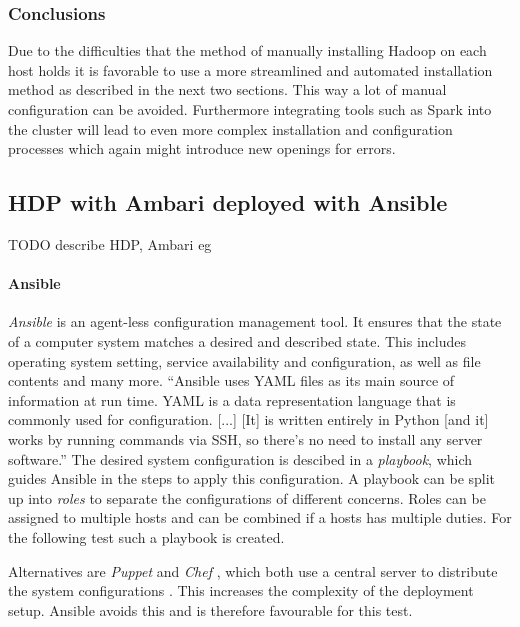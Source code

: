 \subsubsection{Conclusions}

Due to the difficulties that the method of manually installing Hadoop on each host holds it is favorable to use a more streamlined 
and automated installation method as described in the next two sections.
This way a lot of manual configuration can be avoided.
Furthermore integrating tools such as Spark into the cluster 
will lead to even more complex installation and configuration processes which again might introduce new openings for errors.

\subsection{\acl{HDP} with Ambari deployed with Ansible}
\label{sec:design:hdp_ambari_ansible}
TODO describe HDP, Ambari
eg \autocite[][]{hortonworks2018ambari}

\paragraph{Ansible}
\emph{Ansible} is an agent-less configuration management tool.
It ensures that the state of a computer system matches a desired and described state.
This includes operating system setting, service availability and configuration, 
as well as file contents and many more.
\enquote{Ansible uses \ac{YAML} files as its main source of information at run time. 
\ac{YAML} is a data representation language that is commonly used for configuration.
[...]
[It] is written entirely in Python [and it] works by running commands via \ac{SSH}, so there’s no need to install any server software.}
\autocite[][Chap. 1]{heap2016ansible}
The desired system configuration is descibed in a \emph{playbook}, 
which guides Ansible in the steps to apply this configuration.
A playbook can be split up into \emph{roles} to separate the configurations of different concerns.
Roles can be assigned to multiple hosts and can be combined if a hosts has multiple duties.
For the following test such a playbook is created.

Alternatives are \emph{Puppet}  and \emph{Chef}  , which both use a central server to distribute the system configurations \autocite[][Chap. 1]{heap2016ansible}. 
This increases the complexity of the deployment setup.
Ansible avoids this and is therefore favourable for this test.

